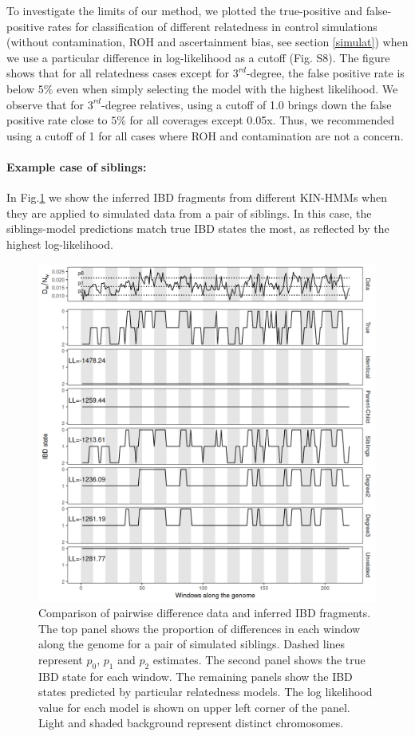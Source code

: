 \documentclass[12pt, letterpaper]{article}
\begin{document}
To investigate the limits of our method, we plotted the true-positive and false-positive rates for classification of different relatedness in control simulations (without contamination, ROH and ascertainment bias, see section \ref{simulat}) when we use a particular difference in log-likelihood as a cutoff (Fig. S8). The figure shows that for all relatedness cases except for $3^{rd}$-degree, the false positive rate is below $5\%$ even when simply selecting the model with the highest likelihood. We observe that for $3^{rd}$-degree relatives, using a cutoff of 1.0 brings down the false positive rate close to $5\%$ for all coverages except 0.05x. Thus, we recommended using a cutoff of 1 for all cases where ROH and contamination are not a concern.


\paragraph{Example case of siblings:}
In Fig.\ref{fig1:ibd} we show the inferred IBD fragments from different KIN-HMMs when they are applied to simulated data from a pair of siblings. In this case, the siblings-model predictions match true IBD states the most, as reflected by the highest log-likelihood. 

\begin{figure}[h!]
    \includegraphics[width=16cm]{plots/plotimg/IBDplot.png}
    \centering
    \caption{Comparison of pairwise difference data and inferred IBD fragments. The top panel shows the proportion of differences in each window along the genome for a pair of simulated siblings. Dashed lines represent $p_0$, $p_1$ and $p_2$ estimates. The second panel shows the true IBD state for each window. The remaining panels show the IBD states predicted by particular relatedness models. The log likelihood value for each model is shown on upper left corner of the panel. Light and shaded background represent distinct chromosomes.}
    \label{fig1:ibd}
\end{figure}
\end{document}
